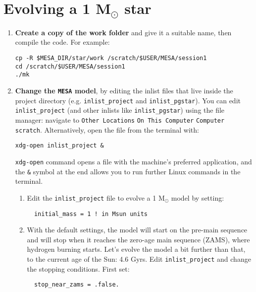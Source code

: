 \documentclass[11pt,a4paper]{article}
\begin{document}
\section{Evolving a 1 \texorpdfstring{M$_\odot$}{Msun} star}

\begin{enumerate}

\item \textbf{Create a copy of the work folder} and give it a suitable name, then compile the code. For example:
\begin{lstlisting}
cp -R $MESA_DIR/star/work /scratch/$USER/MESA/session1
cd /scratch/$USER/MESA/session1
./mk
\end{lstlisting}


\item \textbf{Change the \texttt{MESA} model}, by editing the inlist files that live inside the project directory (e.g. \texttt{inlist\_project} and \texttt{inlist\_pgstar}).
You can edit \verb|inlist_project| (and other inlists like \verb|inlist_pgstar|) using the file manager: navigate to \texttt{Other Locations} \textrightarrow{} \texttt{On This Computer} \textrightarrow{} \texttt{Computer} \textrightarrow{} \texttt{scratch}.  
Alternatively, open the file from the terminal with:
\begin{lstlisting}
xdg-open inlist_project &
\end{lstlisting}
\texttt{xdg-open} command opens a file with the machine's preferred application, and the \texttt{\&} symbol at the end allows you to run further Linux commands in the terminal.

\begin{enumerate}
  \item Edit the \verb|inlist_project| file to evolve a 1 M$_\odot$ model by setting:
  \begin{lstlisting}
  initial_mass = 1 ! in Msun units
  \end{lstlisting}


  \item With the default settings, the model will start on the pre-main sequence and will stop when it reaches the zero-age main sequence (ZAMS), where hydrogen burning starts. Let's evolve the model a bit further than that, to the current age of the Sun: 4.6 Gyrs. Edit \verb|inlist_project| and change the stopping conditions. First set:
  \begin{lstlisting}
  stop_near_zams = .false.
  \end{lstlisting}


\end{enumerate}
\end{enumerate}
\end{document}
